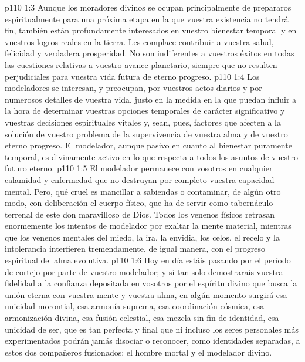 \vs p110 1:3 Aunque los moradores divinos se ocupan principalmente de prepararos espiritualmente para una próxima etapa en la que vuestra existencia no tendrá fin, también están profundamente interesados en vuestro bienestar temporal y en vuestros logros reales en la tierra. Les complace contribuir a vuestra salud, felicidad y verdadera prosperidad. No son indiferentes a vuestros éxitos en todas las cuestiones relativas a vuestro avance planetario, siempre que no resulten perjudiciales para vuestra vida futura de eterno progreso.
\vs p110 1:4 \pc Los modeladores se interesan, y preocupan, por vuestros actos diarios y por numerosos detalles de vuestra vida, justo en la medida en la que puedan influir a la hora de determinar vuestras opciones temporales de carácter significativo y vuestras decisiones espirituales vitales y, sean, pues, factores que afecten a la solución de vuestro problema de la supervivencia de vuestra alma y de vuestro eterno progreso. El modelador, aunque pasivo en cuanto al bienestar puramente temporal, es divinamente activo en lo que respecta a todos los asuntos de vuestro futuro eterno.
\vs p110 1:5 El modelador permanece con vosotros en cualquier calamidad y enfermedad que no destruyan por completo vuestra capacidad mental. Pero, qué cruel es mancillar a sabiendas o contaminar, de algún otro modo, con deliberación el cuerpo físico, que ha de servir como tabernáculo terrenal de este don maravilloso de Dios. Todos los venenos físicos retrasan enormemente los intentos de modelador por exaltar la mente material, mientras que los venenos mentales del miedo, la ira, la envidia, los celos, el recelo y la intolerancia interfieren tremendamente, de igual manera, con el progreso espiritual del alma evolutiva.
\vs p110 1:6 \pc Hoy en día estáis pasando por el período de cortejo por parte de vuestro modelador; y si tan solo demostrarais vuestra fidelidad a la confianza depositada en vosotros por el espíritu divino que busca la unión eterna con vuestra mente y vuestra alma, en algún momento surgirá esa unicidad morontial, esa armonía suprema, esa coordinación cósmica, esa armonización divina, esa fusión celestial, esa mezcla sin fin de identidad, esa unicidad de ser, que es tan perfecta y final que ni incluso los seres personales más experimentados podrán jamás disociar o reconocer, como identidades separadas, a estos dos compañeros fusionados: el hombre mortal y el modelador divino.
